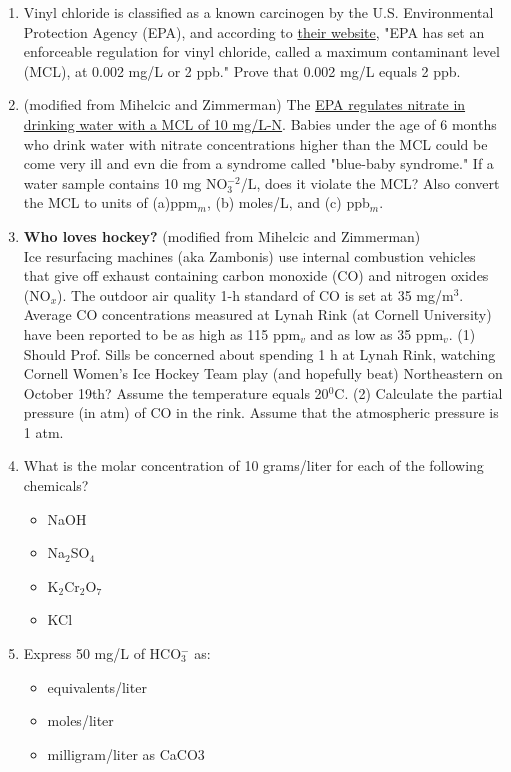 \documentclass[12pt,letterpaper]{article}
\begin{document}
\begin{enumerate}
\item Vinyl chloride is classified as a known carcinogen by the U.S. Environmental Protection Agency (EPA), and according to \href{http://water.epa.gov/drink/contaminants/basicinformation/vinyl-chloride.cfm}{their website}, "EPA has set an enforceable regulation for vinyl chloride, called a maximum contaminant level (MCL), at 0.002 mg/L or 2 ppb."  Prove that 0.002 mg/L equals 2 ppb. 

\item (modified from Mihelcic and Zimmerman) The \href{http://water.epa.gov/drink/contaminants/basicinformation/vinyl-chloride.cfm}{EPA regulates nitrate in drinking water with a MCL of 10 mg/L-N}.  Babies under the age of 6 months who drink water with nitrate concentrations higher than the MCL could be come very ill and evn die from a syndrome called "blue-baby syndrome."  If a water sample contains 10 mg NO$_3^{-2}$/L, does it violate the MCL?  Also convert the MCL to units of (a)ppm$_m$, (b) moles/L, and (c) ppb$_m$. 

\item \textbf{Who loves hockey?} (modified from Mihelcic and Zimmerman)\\
Ice resurfacing machines (aka Zambonis) use internal combustion vehicles that give off exhaust containing carbon monoxide (CO) and nitrogen oxides (NO$_x$).  The outdoor air quality 1-h standard of CO is set at 35 mg/m$^3$. Average CO concentrations measured at Lynah Rink (at Cornell University) have been reported to be as high as 115 ppm$_v$ and as low as 35 ppm$_v$.  (1) Should Prof. Sills be concerned about spending 1 h at Lynah Rink, watching Cornell Women's Ice Hockey Team play (and hopefully beat) Northeastern on October 19th?  Assume the temperature equals 20$^0$C. (2) Calculate the partial pressure (in atm) of CO in the rink.  Assume that the atmospheric pressure is 1 atm.

\item What is the molar concentration of 10 grams/liter for each of the following chemicals?
\begin{itemize}
\item NaOH     
\item Na$_2$SO$_4$   
\item K$_2$Cr$_2$O$_7$   
\item KCl  
\end{itemize}

\item 	Express 50 mg/L of  HCO$_3^-$ as:
\begin{itemize}
\item equivalents/liter
\item moles/liter
\item 	milligram/liter as CaCO3
\end{itemize}


\end{enumerate}
\end{document}
